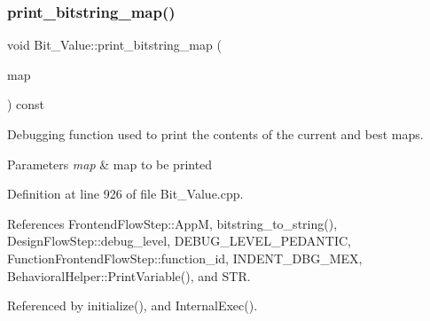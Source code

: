 \subsubsection{\texorpdfstring{print\+\_\+bitstring\+\_\+map()}{print\_bitstring\_map()}}
{\footnotesize\ttfamily void Bit\+\_\+\+Value\+::print\+\_\+bitstring\+\_\+map (\begin{DoxyParamCaption}\item[{const \hyperlink{custom__map_8hpp_ad1ed68f2ff093683ab1a33522b144adc}{Custom\+Unordered\+Map}$<$ unsigned int, std\+::deque$<$ \hyperlink{bit__lattice_8hpp_ab732360111c810c4eaeb4c8b81d160d6}{bit\+\_\+lattice} $>$$>$ \&}]{map }\end{DoxyParamCaption}) const\hspace{0.3cm}{\ttfamily [private]}}



Debugging function used to print the contents of the current and best maps. 


\begin{DoxyParams}{Parameters}
{\em map} & map to be printed \\
\hline
\end{DoxyParams}


Definition at line 926 of file Bit\+\_\+\+Value.\+cpp.



References Frontend\+Flow\+Step\+::\+AppM, bitstring\+\_\+to\+\_\+string(), Design\+Flow\+Step\+::debug\+\_\+level, D\+E\+B\+U\+G\+\_\+\+L\+E\+V\+E\+L\+\_\+\+P\+E\+D\+A\+N\+T\+IC, Function\+Frontend\+Flow\+Step\+::function\+\_\+id, I\+N\+D\+E\+N\+T\+\_\+\+D\+B\+G\+\_\+\+M\+EX, Behavioral\+Helper\+::\+Print\+Variable(), and S\+TR.



Referenced by initialize(), and Internal\+Exec().

